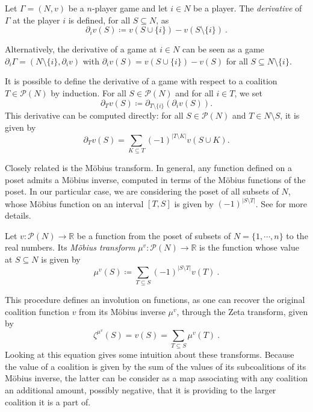 \documentclass[a4paper,12pt]{amsart}
\begin{document}
\begin{definition}
Let $\Gamma = (N, v)$ be a $n$-player game and let $i \in N$ be a player. The \textit{derivative} of $\Gamma$ at the player $i$ is defined, for all \(S \subseteq N\), as 
\[
\partial_i v(S) \coloneqq v(S \cup \{i\}) - v(S\setminus \{i\})~. 
\] 
\end{definition}

Alternatively, the derivative of a game at \(i \in N\) can be seen as a game \(\partial_i \Gamma = (N \setminus \{i\}, \partial_i v)\) with \(\partial_i v(S) = v(S \cup \{i\}) - v(S)\) for all \(S \subseteq N \setminus \{i\}\). 

\medskip 

It is possible to define the derivative of a game with respect to a coalition $T \in \mathcal{P}(N)$ by induction. For all $S \in \mathcal{P}(N)$ and for all $i \in T$, we set 
\[
\partial_T v(S) \coloneqq \partial_{T \setminus \{i\}} \left( \partial_i v(S) \right).  
\]
This derivative can be computed directly: for all $S \in \mathcal{P}(N)$ and $T \in N \setminus S$, it is given by 
\[
\partial_T v(S) = \sum_{K \subseteq T} (-1)^{\lvert T \setminus K \rvert} v(S \cup K).
\]

Closely related is the Möbius transform. In general, any function defined on a poset admits a M{\"o}bius inverse, computed in terms of the M{\"o}bius functions of the poset. In our particular case, we are considering the poset of all subsets of $N$, whose M{\"o}bius function on an interval $[T,S]$ is given by $(-1)^{\lvert S \setminus T \rvert}$. See \cite{Rota1} for more details. 

\begin{definition}\label{definition: Mobius inversion}
Let $v: \mathcal{P}(N) \longrightarrow \mathbb{R}$ be a function from the poset of subsets of $N = \{1,\cdots,n\}$ to the real numbers. Its \textit{Möbius transform} $\mu^v: \mathcal{P}(N) \longrightarrow \mathbb{R}$ is the function whose value at $S \subseteq N$ is given by
\[
\mu^v(S) \coloneqq \sum_{T \subseteq S} (-1)^{\lvert S \setminus T \rvert} v(T)~.
\]
\end{definition}

This procedure defines an involution on functions, as one can recover the original coalition function $v$ from its Möbius inverse $\mu^v$, through the Zeta transform, given by
\[
\zeta^{\mu^v}(S) = v(S) = \sum_{T \subseteq S} \mu^v(T)~.
\]
Looking at this equation gives some intuition about these transforms. Because the value of a coalition is given by the sum of the values of its subcoalitions of its M{\"o}bius inverse, the latter can be consider as a map associating with any coalition an additional amount, possibly negative, that it is providing to the larger coalition it is a part of. 
\end{document}
